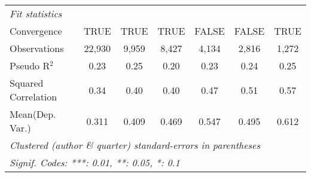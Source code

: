 \begin{tabular}{lcccccc}
   \midrule
   \emph{Fit statistics}\\
   Convergence                                                &TRUE           & TRUE         & TRUE    & FALSE         & FALSE          & TRUE\\  
   Observations                                               & 22,930        & 9,959        & 8,427   & 4,134         & 2,816          & 1,272\\  
   Pseudo R$^2$                                               & 0.23          & 0.25         & 0.20    & 0.23          & 0.24           & 0.25\\  
   Squared Correlation                                        & 0.34          & 0.40         & 0.40    & 0.47          & 0.51           & 0.57\\  
Mean(Dep. Var.) & 0.311 & 0.409 & 0.469 & 0.547 & 0.495 & 0.612 \\
   \midrule \midrule
   \multicolumn{7}{l}{\emph{Clustered (author \& quarter) standard-errors in parentheses}}\\
   \multicolumn{7}{l}{\emph{Signif. Codes: ***: 0.01, **: 0.05, *: 0.1}}\\
\end{tabular}
\par\endgroup
